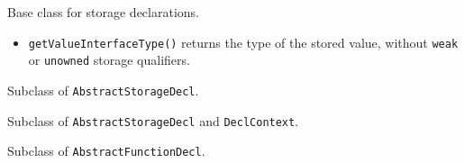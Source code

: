 \documentclass[../generics]{subfiles}
\begin{document}
Base class for storage declarations.
\begin{itemize}
\item \texttt{getValueInterfaceType()} returns the type of the stored value, without \texttt{weak} or \texttt{unowned} storage qualifiers.
\end{itemize}

Subclass of \texttt{AbstractStorageDecl}.

Subclass of \texttt{AbstractStorageDecl} and \texttt{DeclContext}.

Subclass of \texttt{AbstractFunctionDecl}.
\end{document}
